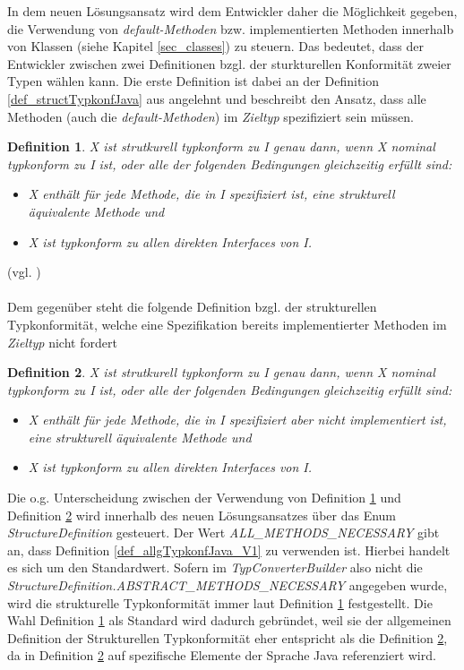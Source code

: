 \documentclass[11pt, 
ngerman,
doublespacing,
chapterinoneline, %
consistentlayout, %
]{scrartcl}
\newtheorem{definition}{Definition}
\begin{document}
In dem neuen Lösungsansatz wird dem Entwickler daher die Möglichkeit gegeben, die Verwendung von \emph{default-Methoden} bzw. implementierten Methoden innerhalb von Klassen (siehe Kapitel \ref{sec_classes}) zu steuern. Das bedeutet, dass der Entwickler zwischen zwei Definitionen bzgl. der sturkturellen Konformität zweier Typen wählen kann. Die erste Definition ist dabei an der Definition \ref{def_structTypkonfJava} aus \cite{structconfjava} angelehnt und beschreibt den Ansatz, dass alle Methoden (auch die \emph{default-Methoden}) im \emph{Zieltyp} spezifiziert sein müssen.
\begin{definition}\label{def_structTypkonfJava_V1}
\emph{X} ist strutkurell typkonform zu \emph{I} genau dann, wenn \emph{X} nominal typkonform zu \emph{I} ist, oder alle der folgenden Bedingungen gleichzeitig erfüllt sind:
\begin{itemize}
\item \emph{X} enthält für jede Methode, die in \emph{I} spezifiziert ist, eine strukturell äquivalente Methode und
\item \emph{X} ist typkonform zu allen direkten Interfaces von \emph{I}.
\end{itemize}
\end{definition} (vgl. \cite{structconfjava})\\\\
Dem gegenüber steht die folgende Definition bzgl. der strukturellen Typkonformität, welche eine Spezifikation bereits implementierter Methoden im \emph{Zieltyp} nicht fordert
\begin{definition}\label{def_structTypkonfJava_V2}
\emph{X} ist strutkurell typkonform zu \emph{I} genau dann, wenn \emph{X} nominal typkonform zu \emph{I} ist, oder alle der folgenden Bedingungen gleichzeitig erfüllt sind:
\begin{itemize}
\item \emph{X} enthält für jede Methode, die in \emph{I} spezifiziert aber nicht implementiert ist, eine strukturell äquivalente Methode und
\item \emph{X} ist typkonform zu allen direkten Interfaces von \emph{I}.
\end{itemize}
\end{definition}
Die o.g. Unterscheidung zwischen der Verwendung von Definition \ref{def_structTypkonfJava_V1} und Definition \ref{def_structTypkonfJava_V2} wird innerhalb des neuen Lösungsansatzes über das Enum \emph{StructureDefinition} gesteuert. Der Wert \emph{ALL\_METHODS\_NECESSARY} gibt an, dass Definition \ref{def_allgTypkonfJava_V1} zu verwenden ist. Hierbei handelt es sich um den Standardwert. Sofern im \emph{TypConverterBuilder} also nicht die \emph{StructureDefinition.ABSTRACT\_METHODS\_NECESSARY} angegeben wurde, wird die strukturelle Typkonformität immer laut Definition \ref{def_structTypkonfJava_V1} festgestellt. Die Wahl Definition \ref{def_structTypkonfJava_V1} als Standard wird dadurch gebründet, weil sie der allgemeinen Definition der Strukturellen Typkonformität eher entspricht als die Definition \ref{def_structTypkonfJava_V2}, da in Definition \ref{def_structTypkonfJava_V2} auf spezifische Elemente der Sprache Java referenziert wird.\\\\
\end{document}
